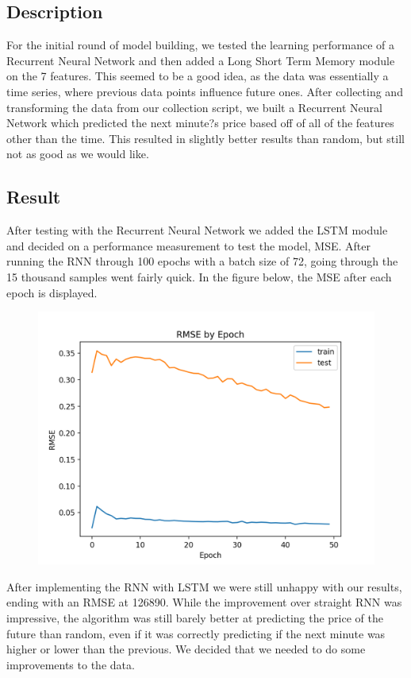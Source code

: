 \documentclass{article}
\begin{document}
\subsection{ Description }
For the initial round of model building, we tested the learning performance of a Recurrent Neural Network and then added a Long Short Term Memory module on the 7 features. This seemed to be a good idea, as the data was essentially a time series, where previous data points influence future ones. After collecting and transforming the data from our collection script, we built a Recurrent Neural Network which predicted the next minute?s price based off of all of the features other than the time.  This resulted in slightly better results than random, but still not as good as we would like.

\subsection{ Result }
After testing with the Recurrent Neural Network we added the LSTM module and decided on a performance measurement to test the model, MSE.  After running the RNN through 100 epochs with a batch size of 72, going through the 15 thousand samples went fairly quick.  In the figure below,  the MSE after each epoch is displayed.

\begin{figure}[htbp]
	\includegraphics[scale=0.55 ]{../pic/rnn.png}
\end{figure}

After implementing the RNN with LSTM we were still unhappy with our results, ending with an RMSE at 126890.  While the improvement over straight RNN was impressive, the algorithm was still barely better at predicting the price of the future than random, even if it was correctly predicting if the next minute was higher or lower than the previous.  We decided that we needed to do some improvements to the data.
\end{document}
